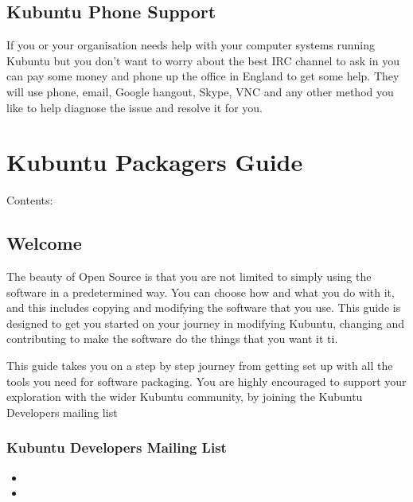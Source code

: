 \documentclass[letterpaper,10pt,english]{sphinxmanual}
\begin{document}
\section{Kubuntu Phone Support}
\label{\detokenize{docs/support:kubuntu-phone-support}}
\sphinxAtStartPar
If you or your organisation needs help with your computer systems running Kubuntu but you don’t want to worry about the best IRC channel to ask in you can pay some money and phone up the office in England to get some help. They will use phone, e\sphinxhyphen{}mail, Google hangout, Skype, VNC and any other method you like to help diagnose the issue and resolve it for you.

\sphinxAtStartPar
{}


\chapter{Kubuntu Packagers Guide}
\label{\detokenize{docs/packaging_guide/packaging:kubuntu-packagers-guide}}\label{\detokenize{docs/packaging_guide/packaging::doc}}
\sphinxAtStartPar
Contents:


\section{Welcome}
\label{\detokenize{docs/packaging_guide/welcome:welcome}}\label{\detokenize{docs/packaging_guide/welcome::doc}}
\sphinxAtStartPar
The beauty of Open Source is that you are not limited to simply using the software in a predetermined way. You can choose how and what you do with it, and this includes copying and modifying the software that you use.
This guide is designed to get you started on your journey in modifying Kubuntu, changing and contributing to make the software do the things that you want it ti.

\sphinxAtStartPar
This guide takes you on a step by step journey from getting set up with all the tools you need for software packaging. You are highly encouraged to support your exploration with the wider Kubuntu community, by joining the Kubuntu Developers mailing list


\subsection{Kubuntu Developers Mailing List}
\label{\detokenize{docs/packaging_guide/welcome:kubuntu-developers-mailing-list}}\begin{itemize}
\item {} 
\sphinxAtStartPar
{}

\item {} 
\sphinxAtStartPar
{}

\end{itemize}
\end{document}
